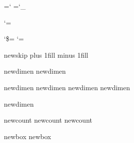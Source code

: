     \chardef\CatAtCode=\catcode`\@
    \chardef\CatUsCode=\catcode`\_
\fi

\catcode`\@=\CatLetter                  %

\begingroup
    \catcode`\$=\CatIgnore
    \catcode`\:=\CatIgnore
\endgroup



\def\xfig@newskip#1{%
    \ifx #1\undefined  \csname newskip\endcsname #1\fi
    }
\def\xfig@newdimen#1{%
    \ifx #1\undefined  \csname newdimen\endcsname #1\fi
    }
\def\xfig@newcount#1{%
    \ifx #1\undefined  \csname newcount\endcsname #1\fi
    }
\def\xfig@newbox#1{%
    \ifx #1\undefined  \csname newbox\endcsname #1\fi
    }









\xfig@newskip\hsssglue \hsssglue=0pt plus 1fill minus 1fill
\def\hsss{\hskip\hsssglue}

\xfig@newdimen\unitlength \xfig@newdimen\linethickness
\xfig@newdimen\@picheight \xfig@newdimen\@xdim \xfig@newdimen\@ydim \xfig@newdimen\@len
\xfig@newdimen\@save
\xfig@newcount\@multicount \xfig@newcount\@xarg \xfig@newcount\@yarg
\xfig@newbox\@picbox \xfig@newbox\@mpbox

